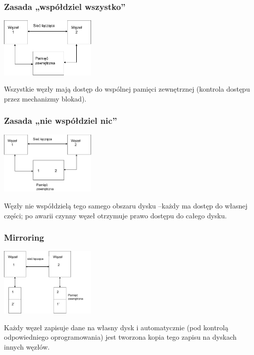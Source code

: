 \documentclass[a4paper,twoside]{article}
\begin{document}
\subsubsection{Zasada „współdziel wszystko”}
\begin{center}
	\includegraphics[width=0.35\textwidth]{./images/klastry04}
\end{center}
Wszystkie węzły mają dostęp do wspólnej pamięci zewnętrznej (kontrola dostępu przez mechanizmy blokad).
\subsubsection{Zasada „nie współdziel nic”}
\begin{center}
	\includegraphics[width=0.35\textwidth]{./images/klastry05}
\end{center}
Węzły nie współdzielą tego samego obszaru dysku –każdy ma dostęp do własnej części; po awarii czynny węzeł otrzymuje prawo dostępu do całego dysku.
\subsubsection{Mirroring}
\begin{center}
	\includegraphics[width=0.35\textwidth]{./images/klastry06}
\end{center}
Każdy węzeł zapisuje dane na własny dysk i automatycznie (pod kontrolą odpowiedniego oprogramowania) jest tworzona kopia tego zapisu na dyskach innych węzłów.
\newpage
\end{document}
